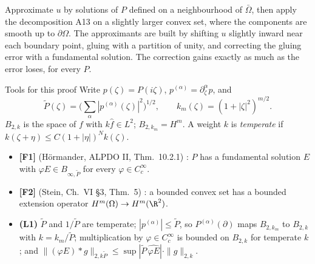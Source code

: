 \begin{proofidea}
Approximate $u$ by solutions of $P$ defined on a neighbourhood of $\bar\Omega$, then apply the decomposition A13 on a slightly larger convex set, where the components are smooth up to $\partial\Omega$. The approximants are built by shifting $u$ slightly inward near each boundary point, gluing with a partition of unity, and correcting the gluing error with a fundamental solution. The correction gains exactly as much as the error loses, for every $P$.
\end{proofidea}

\begin{notebox}{Tools for this proof}
Write $p(\zeta)=P(i\zeta)$, $p^{(\alpha)}=\partial_\zeta^\alpha p$, and
\[
\tilde P(\zeta)=\Big(\sum_\alpha|p^{(\alpha)}(\zeta)|^2\Big)^{1/2},\qquad k_m(\zeta)=(1+|\zeta|^2)^{m/2}.
\]
$B_{2,k}$ is the space of $f$ with $k\hat f\in L^2$; $B_{2,k_m}=H^m$. A weight $k$ is \emph{temperate} if $k(\zeta+\eta)\le C(1+|\eta|)^Nk(\zeta)$.
\begin{itemize}
\item \textbf{[F1]} (H\"ormander, ALPDO II, Thm.~10.2.1) \cf: $P$ has a fundamental solution $E$ with $\varphi E\in B_{\infty,\tilde P}$ for every $\varphi\in C_c^\infty$.
\item \textbf{[F2]} (Stein, Ch.~VI \S3, Thm.~5) \cf: a bounded convex set has a bounded extension operator $H^m(\Omega)\to H^m(\R^2)$.
\item \textbf{(L1)} $\tilde P$ and $1/\tilde P$ are temperate; $|p^{(\alpha)}|\le\tilde P$, so $P^{(\alpha)}(\partial)$ maps $B_{2,k_m}$ to $B_{2,k}$ with $k=k_m/\tilde P$; multiplication by $\varphi\in C_c^\infty$ is bounded on $B_{2,k}$ for temperate $k$; and $\|(\varphi E)*g\|_{2,k\tilde P}\le\sup|\tilde P\,\widehat{\varphi E}|\cdot\|g\|_{2,k}$.
\end{itemize}
\end{notebox}


